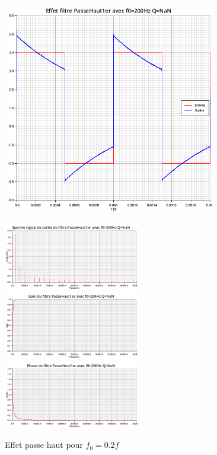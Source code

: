 \documentclass{article}
\begin{document}
\begin{figure}[H]
  \begin{minipage}{0.6\textwidth}
      \centering
      \includegraphics[width=25em]{images/creneau/haut/0.2/signals.png}
  \end{minipage}
  \begin{minipage}{0.3\textwidth}
      \centering
      \includegraphics[width=16em]{images/creneau/haut/0.2/fft_out.png}
      \vfill
      \includegraphics[width=16em]{images/creneau/haut/0.2/gain.png}
      \vfill
      \includegraphics[width=16em]{images/creneau/haut/0.2/phase.png}
  \end{minipage}
  \caption{Effet passe haut pour $f_0=0.2f$}
\end{figure}
\end{document}
